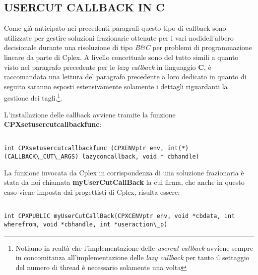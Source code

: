\documentclass[11pt]{article}
\begin{document}
\subsection*{USERCUT CALLBACK IN C}

Come già anticipato nei precedenti paragrafi questo tipo di callback sono utilizzate per gestire soluzioni frazionarie ottenute per i vari nodidell'albero decisionale durante una risoluzione di tipo \textit{B\&C} per problemi di programmazione lineare da parte di Cplex. A livello concettuale sono del tutto simili a quanto visto nel paragrafo precedente per le \textit{lazy callback} in linguaggio \textbf{C}, è raccomandata una lettura del paragrafo precedente a loro dedicato in quanto di seguito saranno esposti estensivamente solamente i dettagli riguardanti la gestione dei tagli.\footnote{Notiamo in realtà che l'implementazione delle \textit{usercut callback} avviene sempre in concomitanza all'implementazione delle \textit{lazy callback} per tanto il settaggio del numero di thread è necessario solamente una volta}.

L'installazione delle callback avviene tramite la funzione \textbf{CPXsetusercutcallbackfunc}:

\begin{lstlisting}

int CPXsetusercutcallbackfunc (CPXENVptr env, int(*)(CALLBACK\_CUT\_ARGS) lazyconcallback, void * cbhandle)

\end{lstlisting}

La funzione invocata da Cplex in corrispondenza di una soluzione frazionaria è stata da noi chiamata \textbf{myUserCutCallBack} la cui firma, che anche in questo caso viene imposta dai progettisti di Cplex, risulta essere:

\begin{lstlisting}

int CPXPUBLIC myUserCutCallBack(CPXCENVptr env, void *cbdata, int wherefrom, void *cbhandle, int *useraction\_p)

\end{lstlisting}
\end{document}
